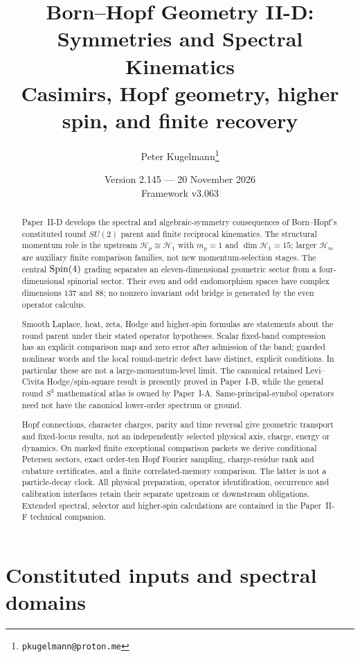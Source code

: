 \documentclass[12pt,a4paper]{article}
\title{\textbf{Born--Hopf Geometry II-D: Symmetries and Spectral Kinematics}\\[0.5em]
\large Casimirs, Hopf geometry, higher spin, and finite recovery}
\author{Peter Kugelmann\thanks{\texttt{pkugelmann@proton.me}}}
\date{Version 2.145 --- 20 November 2026 \\ Framework v3.063}
\begin{document}
\maketitle

\begin{abstract}
Paper~II-D develops the spectral and algebraic-symmetry consequences of
Born--Hopf's constituted round $SU(2)$ parent and finite reciprocal
kinematics.  The structural momentum role is the upstream
$\mathcal H_p\cong\mathcal H_1$ with $m_p=1$ and
$\dim\mathcal H_1=15$; larger $\mathcal H_m$ are auxiliary finite
comparison families, not new momentum-selection stages.  The central
$\mathrm{Spin}(4)$ grading separates an eleven-dimensional geometric sector
from a four-dimensional spinorial sector.  Their even and odd
endomorphism spaces have complex dimensions $137$ and $88$;
no nonzero invariant odd bridge is generated by the even operator
calculus.

Smooth Laplace, heat, zeta, Hodge and higher-spin formulas are
statements about the round parent under their stated operator hypotheses.
Scalar fixed-band compression has an explicit comparison map and zero
error after admission of the band; guarded nonlinear words and the
local round-metric defect have distinct, explicit conditions.  In
particular these are not a large-momentum-level limit.  The canonical
retained Levi--Civita Hodge/spin-square result is presently proved
in Paper~I-B, while the general round $S^3$ mathematical atlas is
owned by Paper~I-A.  Same-principal-symbol operators need not have
the canonical lower-order spectrum or ground.

Hopf connections, character charges, parity and time reversal give
geometric transport and fixed-locus results, not an independently
selected physical axis, charge, energy or dynamics.  On marked finite
exceptional comparison packets we derive conditional Petersen sectors,
exact order-ten Hopf Fourier sampling, charge-residue rank and
cubature certificates, and a finite correlated-memory comparison.
The latter is not a particle-decay clock.  All physical preparation,
operator identification, occurrence and calibration interfaces retain
their separate upstream or downstream obligations.  Extended spectral,
selector and higher-spin calculations are contained in the Paper~II-F
technical companion.
\end{abstract}

\tableofcontents
\listoftables
\newpage


\section{Constituted inputs and spectral domains}
\label{paper2d:sec:organized-scope}
\end{document}

